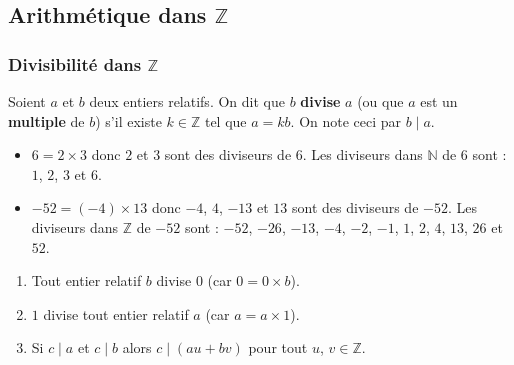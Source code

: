




  \subsection{Arithmétique dans \texorpdfstring{$\mathbb{Z}$}{Z}}

  \subsubsection{Divisibilité dans \texorpdfstring{$\mathbb{Z}$}{Z}}

  \begin{definition}
    Soient $a$ et $b$ deux entiers relatifs. On dit que $b$ \textbf{divise} $a$ (ou que $a$ est un \textbf{multiple} de $b$) s'il existe $k \in \mathbb{Z}$ tel que $a = kb$. On note ceci par $b \mid a$.
  \end{definition}

  \begin{example}
    \begin{itemize}
      \item $6 = 2 \times 3$ donc $2$ et $3$ sont des diviseurs de $6$.
      Les diviseurs dans $\mathbb{N}$ de $6$ sont : $1$, $2$, $3$ et $6$.
      \item $-52 = (-4) \times 13$ donc $-4$, $4$, $-13$ et $13$ sont des diviseurs de $-52$. Les diviseurs dans $\mathbb{Z}$ de $-52$ sont : $-52$, $-26$, $-13$, $-4$, $-2$, $-1$, $1$, $2$, $4$, $13$, $26$ et $52$.
    \end{itemize}
  \end{example}

  \begin{proposition}
    \begin{enumerate}[label=(\roman*)]
      \item Tout entier relatif $b$ divise $0$ (car $0 = 0 \times b$).
      \item $1$ divise tout entier relatif $a$ (car $a = a \times 1$).
      \item Si $c \mid a$ et $c \mid b$ alors $c \mid (au + bv)$ pour tout $u$, $v \in \mathbb{Z}$.
    \end{enumerate}
  \end{proposition}

